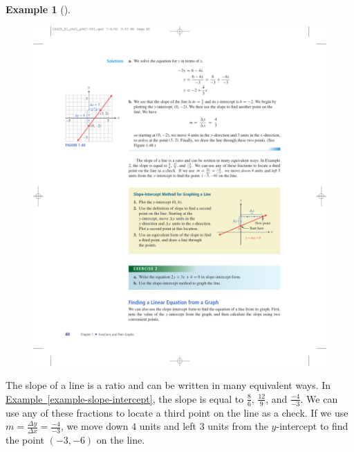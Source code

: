 \documentclass[10pt,]{book}
\theoremstyle{plain}
\theoremstyle{definition}
\theoremstyle{definition}
\newtheorem{example}[theorem]{Example}
\theoremstyle{definition}
\theoremstyle{definition}
\numberwithin{equation}{part}
\begin{document}
\begin{example}[]
\begin{figure}
\includegraphics[width=0.6\linewidth]{images/fig-slope-intercept}
\caption{\label{fig-slope-intercept}}
\end{figure}
%
\end{example}
The slope of a line is a ratio and can be written in many equivalent ways. In \hyperref[example-slope-intercept]{Example~\ref{example-slope-intercept}}, the slope is equal to \(\frac{8}{6}\), \(\frac{12}{9}\), and \(\frac{-4}{-3}\). We can use any of these fractions to locate a third point on the line as a check. If we use \(m = \frac{\Delta y}{\Delta x}= \frac{-4}{-3}\), we move down \(4\) units and left \(3\) units from the \(y\)-intercept to find the point \((-3, -6)\) on the line.%
\end{document}
